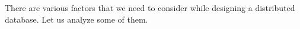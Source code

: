 There are various factors that we need to consider while designing a distributed database. Let us analyze some of them.